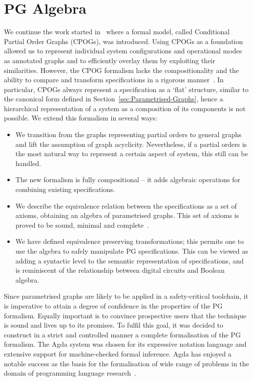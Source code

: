 \section{PG Algebra}

We continue the work started in~\cite{2010_mokhov_ieee}
where a formal model, called Conditional Partial Order Graphs (CPOGs),
was introduced. Using CPOGs as a foundation allowed us to represent individual system configurations
and operational modes as annotated graphs and to efficiently overlay them by exploiting
their similarities. However, the CPOG formalism lacks the compositionality
and the ability to compare and transform specifications in a rigorous
manner~\cite{pg_algebra}. In particular, CPOGs always represent a specification as
a `flat' structure, similar to the canonical form defined in Section~\ref{sec:Parametrised-Graphs},
hence a hierarchical representation of a system as a composition of
its components is not possible. We extend this formalism in several
ways:

\begin{itemize}
\item We transition from the graphs representing partial orders to general graphs and lift the assumption of graph acyclicity.
Nevertheless, if a partial orders is the most natural way to represent
a certain aspect of system, this still can be handled. 
\item The new formalism is fully compositional -- it adds algebraic operations for combining existing specifications.
\item We describe the equivalence relation between the specifications as
a set of axioms, obtaining an algebra of parametrised graphs. This set of axioms is proved
to be sound, minimal and complete~\cite{pg_algebra}.
\item We have defined equivalence preserving transformations; this permits one to use the algebra to safely manipulate PG specifications. 
This can be viewed as adding a syntactic level to the semantic representation
of specifications, and is reminiscent of the relationship between digital
circuits and Boolean algebra.
\end{itemize}

Since parametrised graphs are likely to be applied in a safety-critical toolchain, it is imperative to attain a degree of confidence in the properties of the PG formalism. Equally important is to convince prospective users that the technique is sound and lives up to its promises. To fulfil this goal, it was decided to construct in a strict and controlled manner a complete formalisation of the PG formalism. The Agda system \cite{norell:thesis} was chosen for its expressive notation language and extensive support for machine-checked formal inference. Agda has enjoyed a notable success as the basis for the formalisation of wide range of problems in the domain of programming language research~\cite{LTL-types-FRP,indexed-containers}.

